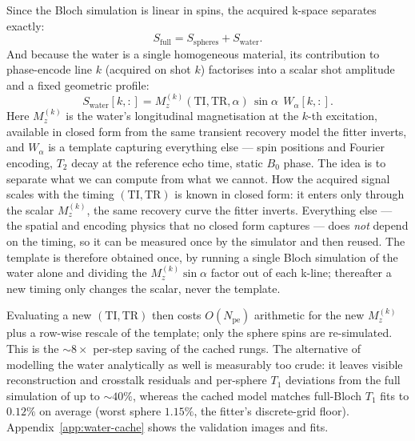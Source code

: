 Since the Bloch simulation is linear in spins, the acquired k-space separates
exactly:
\[
    S_\mathrm{full} = S_\mathrm{spheres} + S_\mathrm{water}.
\]
And because the water is a single homogeneous material, its contribution to
phase-encode line $k$ (acquired on shot $k$) factorises into a scalar shot
amplitude and a fixed geometric profile:
\[
    S_\mathrm{water}[k,:] = M_z^{(k)}(\mathrm{TI},\mathrm{TR},\alpha)\,
    \sin\alpha \,\; W_\alpha[k,:].
\]
Here $M_z^{(k)}$ is the water's longitudinal magnetisation at the $k$-th
excitation, available in closed form from the same transient recovery model
the fitter inverts, and $W_\alpha$ is a template capturing everything else --- spin positions and Fourier encoding, $T_2$ decay at the reference echo time, static $B_0$ phase. The idea is to separate what we can compute from what we cannot. How the
acquired signal scales with the timing $(\mathrm{TI},\mathrm{TR})$ is known
in closed form: it enters only through the scalar $M_z^{(k)}$, the same
recovery curve the fitter inverts. Everything else --- the spatial and
encoding physics that no closed form captures --- does \emph{not} depend on
the timing, so it can be measured once by the simulator and then reused. The
template is therefore obtained once, by running a single Bloch simulation of
the water alone and dividing the $M_z^{(k)}\sin\alpha$ factor out of each
k-line; thereafter a new timing only changes the scalar, never the template.

Evaluating a new $(\mathrm{TI},\mathrm{TR})$ then costs $O(N_\mathrm{pe})$
arithmetic for the new $M_z^{(k)}$ plus a row-wise rescale of the template;
only the sphere spins are re-simulated. This is the ${\sim}8\times$ per-step
saving of the cached rungs. The alternative of modelling the water
analytically as well is measurably too crude: it leaves visible
reconstruction and crosstalk residuals and per-sphere $T_1$ deviations from
the full simulation of up to ${\sim}40\%$, whereas the cached model matches
full-Bloch $T_1$ fits to $0.12\%$ on average (worst sphere $1.15\%$, the
fitter's discrete-grid floor). Appendix~\ref{app:water-cache} shows the
validation images and fits.

